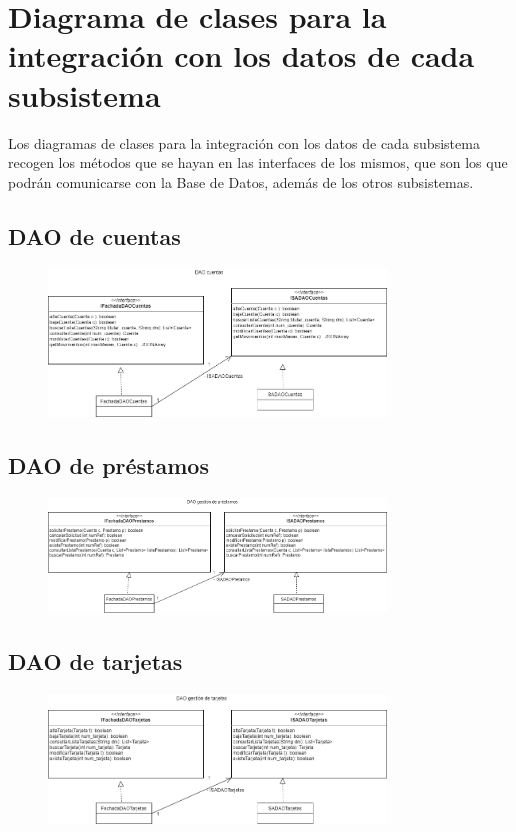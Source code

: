 \documentclass[12pt]{article}
\begin{document}
\newpage
\section{Diagrama de clases para la integración con los datos de cada subsistema}
Los diagramas de clases para la integración con los datos de cada subsistema recogen los métodos que se hayan en las interfaces de los mismos, que son los que podrán comunicarse con la Base de Datos, además de los otros subsistemas.
\subsection{DAO de cuentas}
\begin{figure}[H]
    \centering
    \includegraphics[width=0.8\textwidth]{images/DAOCuentas.png}
\end{figure}
\subsection{DAO de préstamos}
\begin{figure}[H]
    \centering
    \includegraphics[width=0.8\textwidth]{images/DAOPrestamos.png}
\end{figure}
\subsection{DAO de tarjetas}
\begin{figure}[H]
    \centering
    \includegraphics[width=0.8\textwidth]{images/DAOTarjeta.png}
\end{figure}
\end{document}
